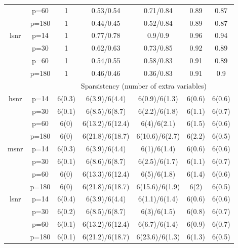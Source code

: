 \begin{table}[ht]
{\begin{tabular}{|c|c|ccccc|}
   & p=60 & 1 & 0.53/0.54 & 0.71/0.84 & 0.89 & 0.87 \\ 
   & p=180 & 1 & 0.44/0.45 & 0.52/0.84 & 0.89 & 0.87 \\ 
  \midrule\multirow{4}[2]{*}{lsnr} & p=14 & 1 & 0.77/0.78 & 0.9/0.9 & 0.96 & 0.94 \\ 
   & p=30 & 1 & 0.62/0.63 & 0.73/0.85 & 0.92 & 0.89 \\ 
   & p=60 & 1 & 0.54/0.55 & 0.58/0.83 & 0.91 & 0.89 \\ 
   & p=180 & 1 & 0.46/0.46 & 0.36/0.83 & 0.91 & 0.9 \\ 
   \midrule 
 \multicolumn{1}{|c}{} &       & \multicolumn{5}{c|}{Sparsistency (number of extra variables)} \\
\midrule\multirow{4}[2]{*}{hsnr} & p=14 & 6(0.3) & 6(3.9)/6(4.4) & 6(0.9)/6(1.3) & 6(0.6) & 6(0.6) \\ 
   & p=30 & 6(0.1) & 6(8.5)/6(8.7) & 6(2.2)/6(1.8) & 6(1.1) & 6(0.7) \\ 
   & p=60 & 6(0) & 6(13.2)/6(12.4) & 6(4)/6(2.1) & 6(1.5) & 6(0.6) \\ 
   & p=180 & 6(0) & 6(21.8)/6(18.7) & 6(10.6)/6(2.7) & 6(2.2) & 6(0.5) \\ 
  \midrule\multirow{4}[2]{*}{msnr} & p=14 & 6(0.3) & 6(3.9)/6(4.4) & 6(1)/6(1.4) & 6(0.6) & 6(0.6) \\ 
   & p=30 & 6(0.1) & 6(8.6)/6(8.7) & 6(2.5)/6(1.7) & 6(1.1) & 6(0.7) \\ 
   & p=60 & 6(0) & 6(13.3)/6(12.4) & 6(5)/6(1.8) & 6(1.4) & 6(0.6) \\ 
   & p=180 & 6(0) & 6(21.8)/6(18.7) & 6(15.6)/6(1.9) & 6(2) & 6(0.5) \\ 
  \midrule\multirow{4}[2]{*}{lsnr} & p=14 & 6(0.4) & 6(3.9)/6(4.4) & 6(1.1)/6(1.4) & 6(0.6) & 6(0.6) \\ 
   & p=30 & 6(0.2) & 6(8.5)/6(8.7) & 6(3)/6(1.5) & 6(0.8) & 6(0.7) \\ 
   & p=60 & 6(0.1) & 6(13.2)/6(12.4) & 6(6.7)/6(1.4) & 6(0.9) & 6(0.7) \\ 
   & p=180 & 6(0.1) & 6(21.2)/6(18.7) & 6(23.6)/6(1.3) & 6(1.3) & 6(0.5) \\ 
   \bottomrule 
\end{tabular}
}
\end{table}
